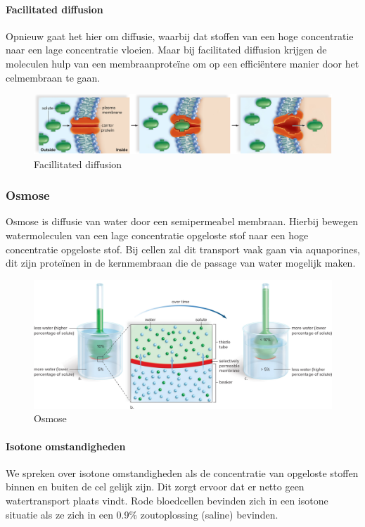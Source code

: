 \documentclass[a4paper,kul]{kulakarticle} %
\begin{document}
\paragraph{Facilitated diffusion}
Opnieuw gaat het hier om diffusie, waarbij dat stoffen van een hoge concentratie naar een lage concentratie vloeien. Maar bij facilitated diffusion krijgen de moleculen hulp van een membraanproteïne om op een efficiëntere manier door het celmembraan te gaan.  
\begin{figure}[h]
	\centering
	\includegraphics[width=0.7\linewidth]{FacilitatedDiffusion}
	\caption[Facilitated diffusion]{Facillitated diffusion}
	\label{fig:facilitateddiffusion}
\end{figure}

\subsubsection{Osmose}
Osmose is diffusie van water door een semipermeabel membraan. Hierbij bewegen watermoleculen van een lage concentratie opgeloste stof naar een hoge concentratie opgeloste stof. Bij cellen zal dit transport vaak gaan via aquaporines, dit zijn proteïnen in de kernmembraan die de passage van water mogelijk maken. 
\begin{figure}[h]
	\centering
	\includegraphics[width=0.7\linewidth]{Osmose}
	\caption[Osmose]{Osmose}
	\label{fig:osmose}
\end{figure}
\paragraph{Isotone omstandigheden}
We spreken over isotone omstandigheden als de concentratie van opgeloste stoffen binnen en buiten de cel gelijk zijn. Dit zorgt ervoor dat er netto geen watertransport plaats vindt. Rode bloedcellen bevinden zich in een isotone situatie als ze zich in een 0.9\% zoutoplossing (saline) bevinden.
\end{document}
